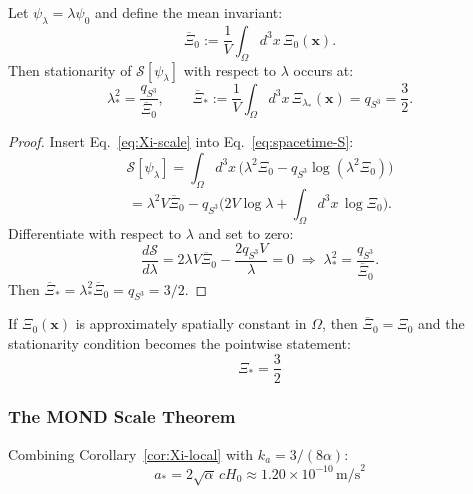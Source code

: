 \begin{theorem}\label{thm:Xi-mean}
Let $\psi_\lambda = \lambda\psi_0$ and define the mean invariant:
\[
\overline{\Xi}_0 := \frac{1}{V}\int_\Omega d^3x\,\Xi_0(\mathbf{x}).
\]
Then stationarity of $\mathcal{S}[\psi_\lambda]$ with respect to $\lambda$ occurs at:
\begin{equation}
\lambda_*^2 = \frac{q_{S^3}}{\overline{\Xi}_0}, \qquad \overline{\Xi}_* := \frac{1}{V}\int_\Omega d^3x\,\Xi_{\lambda_*}(\mathbf{x}) = q_{S^3} = \frac{3}{2}.
\label{eq:Xi-star-mean}
\end{equation}
\end{theorem}
\begin{proof}
Insert Eq.~\eqref{eq:Xi-scale} into Eq.~\eqref{eq:spacetime-S}:
\[
\mathcal{S}[\psi_\lambda] = \int_\Omega d^3x\,\Big(\lambda^2\Xi_0 - q_{S^3}\log(\lambda^2\Xi_0)\Big)
\]
\[
= \lambda^2 V\overline{\Xi}_0 - q_{S^3}\Big(2V\log\lambda + \int_\Omega d^3x\,\log\Xi_0\Big).
\]
Differentiate with respect to $\lambda$ and set to zero:
\[
\frac{d\mathcal{S}}{d\lambda} = 2\lambda V\overline{\Xi}_0 - \frac{2q_{S^3}V}{\lambda} = 0 \;\Rightarrow\; \lambda_*^2 = \frac{q_{S^3}}{\overline{\Xi}_0}.
\]
Then $\overline{\Xi}_* = \lambda_*^2\overline{\Xi}_0 = q_{S^3} = 3/2$.
\end{proof}

\begin{corollary}\label{cor:Xi-local}
If $\Xi_0(\mathbf{x})$ is approximately spatially constant in $\Omega$, then $\overline{\Xi}_0 = \Xi_0$ and the stationarity condition becomes the pointwise statement:
\begin{equation}
\boxed{\Xi_* = \frac{3}{2}}
\label{eq:Xi-star-result}
\end{equation}
\end{corollary}

\subsubsection{The MOND Scale Theorem}

\begin{theorem}\label{thm:a-star-final}
Combining Corollary~\ref{cor:Xi-local} with $k_a = 3/(8\alpha)$:
\begin{equation}
\boxed{a_* = 2\sqrt{\alpha}\,cH_0 \approx 1.20 \times 10^{-10}\,\mathrm{m/s}^2}
\label{eq:a-star-theorem}
\end{equation}
\end{theorem}

